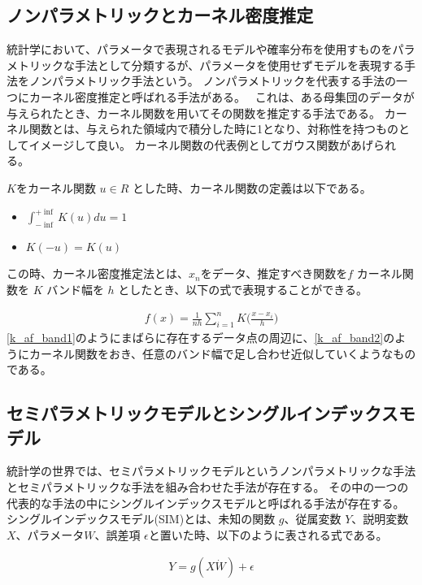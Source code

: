 \subsection{ノンパラメトリックとカーネル密度推定}
統計学において、パラメータで表現されるモデルや確率分布を使用すものをパラメトリックな手法として分類するが、パラメータを使用せずモデルを表現する手法をノンパラメトリック手法という。
ノンパラメトリックを代表する手法の一つにカーネル密度推定と呼ばれる手法がある。~\cite{kernel_density}
これは、ある母集団のデータが与えられたとき、カーネル関数を用いてその関数を推定する手法である。
カーネル関数とは、与えられた領域内で積分した時に1となり、対称性を持つものとしてイメージして良い。
カーネル関数の代表例としてガウス関数があげられる。

$ K $をカーネル関数 $ u \in R $ とした時、カーネル関数の定義は以下である。

\begin{itemize}
  \item $ \int^{+ \inf}_{- \inf} K(u)du = 1 $
  \item $ K(-u) = K(u) $
\end{itemize}


この時、カーネル密度推定法とは、$ x_n $をデータ、推定すべき関数を$ f $ カーネル関数を $ K $ バンド幅を $ h $ としたとき、以下の式で表現することができる。


\begin{eqnarray}
f(x) = \frac{1}{nh} \sum^n_{i=1}K \bigl( \frac{x - x_i}{h}\bigr)
\label{eq:k-af}
\end{eqnarray}
\ref{k_af_band1}のようにまばらに存在するデータ点の周辺に、\ref{k_af_band2}のようにカーネル関数をおき、任意のバンド幅で足し合わせ近似していくようなものである。






\subsection{セミパラメトリックモデルとシングルインデックスモデル}

統計学の世界では、セミパラメトリックモデルというノンパラメトリックな手法とセミパラメトリックな手法を組み合わせた手法が存在する。
その中の一つの代表的な手法の中にシングルインデックスモデルと呼ばれる手法が存在する。
シングルインデックスモデル(SIM)とは、未知の関数 $ g $、従属変数 $ Y $、説明変数$ X $、パラメータ$ W $、誤差項 $ \epsilon $と置いた時、以下のように表される式である。

\begin{eqnarray}
Y = g(X \dot W) + \epsilon
\label{eq:k-af}
\end{eqnarray}

